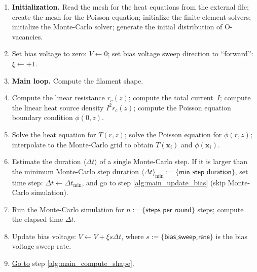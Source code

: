 \documentclass[10pt]{article}
\renewcommand{\vec}[1]{\mathbf{#1}}
\newcommand{\vx}{\vec{x}}
\begin{document}
\begin{enumerate}
	\item \textbf{Initialization.} Read the mesh for the heat equations from the
	      external file; create the mesh for the Poisson equation; initialize the
	      finite-element solvers; initialize the Monte-Carlo solver; generate the
	      initial distribution of O-vacancies.

	\item Set bias voltage to zero: $V \gets 0$; set bias voltage sweep direction
	      to ``forward'': $\xi \gets +1$.

	\item \label{alg:main_compute_shape} \textbf{Main loop.} Compute the filament
	      shape.

	\item Compute the linear resistance $r_c(z)$; compute the total current~$I$;
	      compute the linear heat source density $I^2 r_c(z)$; compute the Poisson
		  equation boundary condition $\phi(0, z)$.

	\item Solve the heat equation for $T(r, z)$; solve the Poisson equation for
	      $\phi(r, z)$; interpolate to the Monte-Carlo grid to obtain $T(\vx_i)$
	      and $\phi(\vx_i)$.

	\item Estimate the duration $\langle \Delta t \rangle$ of a single Monte-Carlo
	      step. If it is larger than the minimum Monte-Carlo step duration
	      $\langle \Delta t \rangle_{\min} := \{ \mathsf{min\_step\_duration} \}$,
	      set time step: $\Delta t \gets \overline{\Delta t}_{\min}$, and go to
	      step \ref{alg:main_update_bias} (skip Monte-Carlo simulation).

	\item Run the Monte-Carlo simulation for $n := \{ \mathsf{steps\_per\_round} \}$
	      steps; compute the elapsed time $\Delta t$.

	\item \label{alg:main_update_bias} Update bias voltage:
	      $V \gets V + \xi s \Delta t$, where $s := \{ \mathsf{bias\_sweep\_rate} \}$
	      is the bias voltage sweep rate.

	\item \underline{Go to} step \ref{alg:main_compute_shape}.
\end{enumerate}
\end{document}
